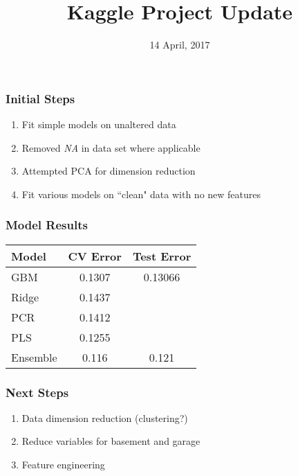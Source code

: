 \documentclass[xcolor=dvipsnames]{beamer}
\title[Machine Learning]{Kaggle Project Update}
\author[Stat 602]{}
\date{14 April, 2017}
\begin{document}
\begin{frame}
\titlepage
\end{frame}

\begin{frame}\frametitle{Initial Steps}

\begin{enumerate}
\item Fit simple models on unaltered data
\item Removed \emph{NA} in data set where applicable
\item Attempted PCA for dimension reduction
\item Fit various models on ``clean" data with no new features
\end{enumerate}

\end{frame}

\begin{frame}\frametitle{Model Results}

\begin{center}
\begin{tabular}{l c c}
	\hline
	Model & CV Error & Test Error \\
	\hline
	GBM & 0.1307 & 0.13066 \\
	Ridge & 0.1437 & \\
	PCR & 0.1412 & \\
        PLS & 0.1255 & \\
	Ensemble & 0.116 & 0.121 \\
	\hline
\end{tabular}
\end{center}
\end{frame}

\begin{frame}\frametitle{Next Steps}

\begin{enumerate}
\item Data dimension reduction (clustering?)
\item Reduce variables for basement and garage
\item Feature engineering
\end{enumerate}

\end{frame}
\end{document}
